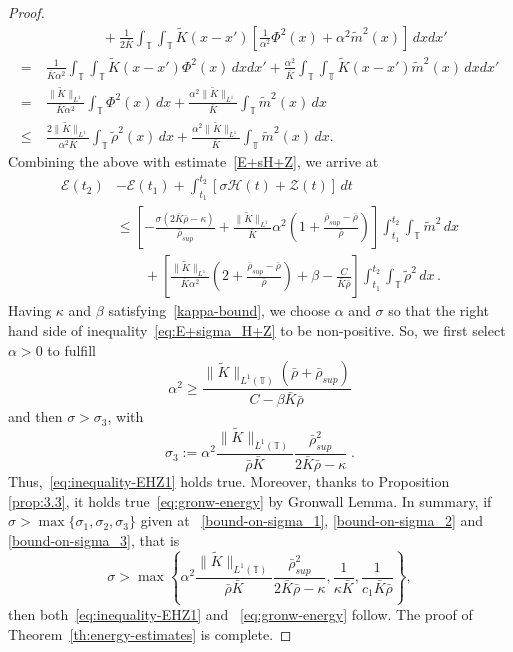 \documentclass[10pt,reqno]{amsart}
\newcommand{\bbt} {\mathbb T}
\begin{document}
\begin{proof}
\begin{align*}
    &\qquad \qquad + \frac{1}{2\bar K}\int_\bbt\int_\bbt \tilde K(x-x')[\frac{1}{\alpha^2}\Phi^2(x)+\alpha^2\tilde m^2(x)]\,dxdx'\\
   =~ &\frac{1}{\bar K\alpha^2}\int_\bbt\int_\bbt \tilde K(x-x')\Phi^2(x)\,dxdx' + \frac{\alpha^2}{\bar K}\int_\bbt\int_\bbt \tilde K(x-x') \tilde m^2(x)\,dxdx'\\
    =  ~&  \frac{\| \tilde K\|_{L^1}}{\bar K\alpha^2}\int_\bbt\Phi^2(x)\,dx + \frac{\alpha^2\| \tilde K\|_{L^1}}{\bar K}\int_\bbt  \tilde m^2(x)\,dx\\
  \leq ~&  \frac{2\| \tilde K\|_{L^1}}{\alpha^2\bar K}\int_\bbt\tilde\rho^2(x)\,dx + \frac{\alpha^2\| \tilde K\|_{L^1}}{\bar K}\int_\bbt  \tilde m^2(x)\,dx.
\end{align*}
Combining the above with estimate~\eqref{E+sH+Z}, we arrive at
\begin{align}
    \mathcal{E}(t_2)  &-\mathcal{E}(t_1)  + \int_{t_1}^{t_2}\left[\sigma \mathcal{H}(t) + \mathcal{Z}(t)\right]\,dt \nonumber\\
    & \leq \left[- \frac{\sigma(2\bar K\bar\rho-\kappa)}{\bar\rho_{sup}}+\frac{\|\tilde K\|_{L^1}}{\bar K}\alpha^2\left(  1+\frac{\bar\rho_{sup}-\bar\rho}{\bar\rho}\right)\right]\int_{t_1}^{t_2}\int_\bbt \tilde m^2\,dx \nonumber\\
    & \qquad + \left[\frac{\|\tilde K\|_{L^1}}{\bar K\alpha^2}\left( 2+\frac{\bar\rho_{sup}-\bar\rho}{\bar\rho} \right) + \beta - \frac{C}{\bar K\bar\rho}\right]\int_{t_1}^{t_2}\int_\bbt\tilde\rho^2\,dx\,. \label{eq:E+sigma_H+Z}
\end{align}
Having $\kappa$ and $\beta$ satisfying~\eqref{kappa-bound}, we choose $\alpha$ and $\sigma$ 
so that the right hand side of inequality~\eqref{eq:E+sigma_H+Z} to be non-positive. 
So, we first select $\alpha>0$ to fulfill
\begin{equation}\label{cond-on-alpha}
\alpha^2\geq \frac{\| \tilde K \|_{L^1(\bbt)}(\bar\rho+\bar\rho_{sup})}{C-\beta\bar K\bar\rho}
\end{equation}
and then $\sigma>\sigma_3$, with
\begin{equation}\label{bound-on-sigma_3}
\sigma_3:=\alpha^2 \frac{\| \tilde K \|_{L^1(\bbt)}}{\bar\rho\bar K}\frac{\bar\rho_{sup}^2}{2\bar K\bar\rho-\kappa}\;.
\end{equation}
Thus,~\eqref{eq:inequality-EHZ1} holds true. Moreover, thanks to Proposition \ref{prop:3.3}, it holds true~\eqref{eq:gronw-energy} by Gronwall Lemma. 
In summary, if $\sigma>\max\{\sigma_1,\sigma_2,\sigma_3\}$ given at ~\eqref{bound-on-sigma_1}, \eqref{bound-on-sigma_2} and \eqref{bound-on-sigma_3}, that is
\begin{equation}
\sigma  > \max\left\{ \alpha^2 \frac{\| \tilde K \|_{L^1(\bbt)}}{\bar\rho\bar K}\frac{\bar\rho_{sup}^2}{2\bar K\bar\rho-\kappa}, \frac 1 {\kappa \bar K}, \frac{1}{c_1\bar K\bar\rho}\right\},\label{eq:constants}    
\end{equation}
then both~\eqref{eq:inequality-EHZ1} and ~\eqref{eq:gronw-energy} follow. The proof of Theorem~\ref{th:energy-estimates} is complete.
\end{proof}
\end{document}
